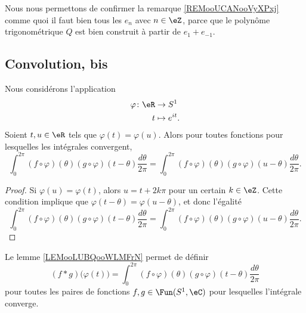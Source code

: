 Nous nous permettons de confirmer la remarque \ref{REMooUCANooVyXPxj} comme quoi il faut bien tous les \( e_n\) avec \( n\in \eZ\), parce que le polynôme trigonométrique \( Q\) est bien construit à partir de \( e_1+e_{-1}\).

\subsection{Convolution, bis}

\begin{lemma}       \label{LEMooLUBQooWLMFrN}
    Nous considérons l'application
    \begin{equation}
        \begin{aligned}
            \varphi\colon \eR&\to S^1 \\
            t&\mapsto e^{it}.
        \end{aligned}
    \end{equation}
    Soient \( t,u\in \eR\) tels que \( \varphi(t)=\varphi(u)\). Alors pour toutes fonctions pour lesquelles les intégrales convergent,
    \begin{equation}
        \int_0^{2\pi}(f\circ \varphi)(\theta)(g\circ\varphi)(t-\theta)\frac{ d\theta }{ 2\pi }=\int_0^{2\pi}(f\circ \varphi)(\theta)(g\circ\varphi)(u-\theta)\frac{ d\theta }{ 2\pi }.
    \end{equation}
\end{lemma}

\begin{proof}
    Si \( \varphi(u)=\varphi(t)\), alors \( u=t+2k\pi\) pour un certain \( k\in \eZ\). Cette condition implique que \( \varphi(t-\theta)=\varphi(u-\theta)\), et donc l'égalité 
    \begin{equation}
        \int_0^{2\pi}(f\circ \varphi)(\theta)(g\circ\varphi)(t-\theta)\frac{ d\theta }{ 2\pi }=\int_0^{2\pi}(f\circ \varphi)(\theta)(g\circ\varphi)(u-\theta)\frac{ d\theta }{ 2\pi }.
    \end{equation}
\end{proof}

\begin{definition}
    Le lemme \ref{LEMooLUBQooWLMFrN} permet de définir
    \begin{equation}
        (f*g)\big( \varphi(t) \big)=\int_0^{2\pi}(f\circ \varphi)(\theta)(g\circ\varphi)(t-\theta)\frac{ d\theta }{ 2\pi }
    \end{equation}
    pour toutes les paires de fonctions \( f,g\in \Fun(S^1,\eC)\) pour lesquelles l'intégrale converge.
\end{definition}

